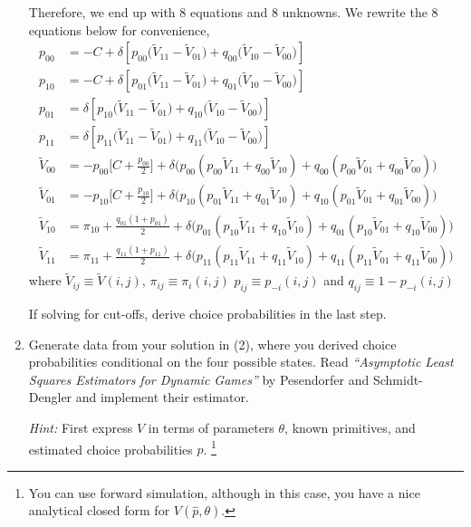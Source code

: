 \documentclass{article}
\begin{document}
\begin{enumerate}
\begin{answer}
Therefore, we end up with 8 equations and 8 unknowns. We rewrite the 8 equations below for convenience,
\begin{align}
    p_{00} &= -C + \delta \left[p_{00}\Bigr(\tilde{V}_{11}-\tilde{V}_{01}\Bigr) + q_{00}\Bigr(\tilde{V}_{10}-\tilde{V}_{00}\Bigr)\right] \\
    p_{10} &= -C + \delta \left[p_{01}\Bigr(\tilde{V}_{11}-\tilde{V}_{01}\Bigr) + q_{01}\Bigr(\tilde{V}_{10}-\tilde{V}_{00}\Bigr)\right] \\
    p_{01} &= \delta \left[p_{10}\Bigr(\tilde{V}_{11}-\tilde{V}_{01}\Bigr) + q_{10}\Bigr(\tilde{V}_{10}-\tilde{V}_{00}\Bigr)\right] \\
    p_{11} &= \delta \left[p_{11}\Bigr(\tilde{V}_{11}-\tilde{V}_{01}\Bigr) + q_{11}\Bigr(\tilde{V}_{10}-\tilde{V}_{00}\Bigr)\right] \\
    \tilde{V}_{00} &= -p_{00}\Bigr[C + \frac{p_{00}}{2} \Bigr] + \delta\Bigr(p_{00}(p_{00}\tilde{V}_{11} + q_{00}\tilde{V}_{10}) + q_{00}(p_{00}\tilde{V}_{01} + q_{00}\tilde{V}_{00})\Bigr) \\
    \tilde{V}_{01} &= -p_{10}\Bigr[C + \frac{p_{10}}{2} \Bigr] + \delta\Bigr(p_{10}(p_{01}\tilde{V}_{11} + q_{01}\tilde{V}_{10}) + q_{10}(p_{01}\tilde{V}_{01} + q_{01}\tilde{V}_{00})\Bigr) \\
    \tilde{V}_{10} &=\pi_{10} + \frac{q_{01}(1+p_{01})}{2}   + \delta\Bigr(p_{01}(p_{10}\tilde{V}_{11} + q_{10}\tilde{V}_{10}) + q_{01}(p_{10}\tilde{V}_{01} + q_{10}\tilde{V}_{00}) \Bigr) \\
    \tilde{V}_{11}&=\pi_{11} + \frac{q_{11}(1+p_{11})}{2}  + \delta\Bigr(p_{11}(p_{11}\tilde{V}_{11} + q_{11}\tilde{V}_{10})+q_{11}(p_{11}\tilde{V}_{01} + q_{11}\tilde{V}_{00})\Bigr)
\end{align}
where $\tilde{V}_{ij}\equiv\tilde{V}(i,j)$, $\pi_{ij}\equiv\pi_{i}(i,j)$ $p_{ij}\equiv p_{-i}(i,j)$ and $q_{ij}\equiv 1-p_{-i}(i,j)$

\end{answer}


    If solving for cut-offs, derive choice probabilities in the last step.

    \item Generate data from your solution in (2), where you derived choice probabilities conditional on the four possible states. Read \textit{“Asymptotic Least Squares Estimators for Dynamic Games”} by Pesendorfer and Schmidt-Dengler and implement their estimator.

    \textit{Hint:} First express $V$ in terms of parameters $\theta$, known primitives, and estimated choice probabilities $\hat{p}$. \footnote{You can use forward simulation, although in this case, you have a nice analytical closed form for $V(\hat{p}, \theta)$.}


\end{enumerate}
\end{document}
